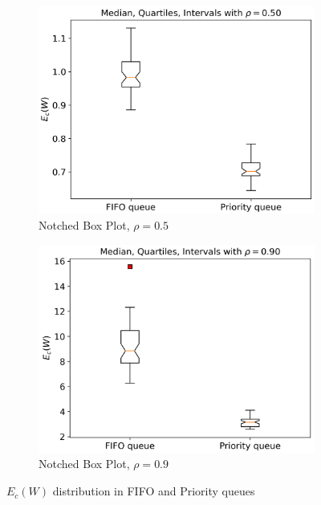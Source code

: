 \documentclass{article}
\begin{document}
    \begin{figure}[h]
        \centering
        \begin{subfigure}[b]{0.47\textwidth}
            \includegraphics[width=\textwidth]{pictures/part_3/box_plot_rho_050.png}
            \caption{Notched Box Plot, $\rho = 0.5$}
            \label{fig:q3_notchedbox_050}
        \end{subfigure}
        \begin{subfigure}[b]{0.47\textwidth}
            \includegraphics[width=\textwidth]{pictures/part_3/box_plot_rho_090.png}
            \caption{Notched Box Plot, $\rho = 0.9$}
            \label{fig:q3_notchedbox_090}
        \end{subfigure}
        \caption{$E_c(W)$ distribution in FIFO and Priority queues}
        \label{fig:fifo_vs_priority}
    \end{figure}
\end{document}
